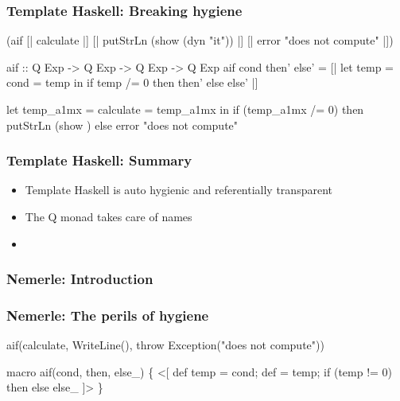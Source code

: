 \documentclass[hyperref={bookmarks=false}]{beamer}
\begin{document}
\begin{frame}[fragile]
\frametitle{Template Haskell: Breaking hygiene}
\begin{semiverbatim}
{\textdollar}(aif [| calculate |]
  [| putStrLn (show \alert{{\textdollar}(dyn "it")}) |]
  [| error "does not compute" |])

aif :: Q Exp -> Q Exp -> Q Exp -> Q Exp
aif cond then' else' =
  [| let temp = {\textdollar}cond
         \text{\color{red}{it}} = temp
     in if temp /= 0 then {\textdollar}then' else {\textdollar}else' |]

let temp_a1mx = calculate
    \text{\color{red}{it_a1my}} = temp_a1mx
in if (temp_a1mx /= 0)
   then putStrLn (show \text{\color{blue}{it_a1my}})
   else error "does not compute"
\end{semiverbatim}
\end{frame}

\begin{frame}[fragile]
\frametitle{Template Haskell: Summary}
\begin{itemize}
\item Template Haskell is auto hygienic and referentially transparent
\item The Q monad takes care of names
\item \text{\color{blue}{Sometimes we need to break hygiene}}
\end{itemize}
\end{frame}

\begin{frame}[fragile]
\frametitle<1>{Nemerle: Introduction}
\frametitle<2>{Nemerle: The perils of hygiene}
\begin{semiverbatim}
aif(calculate,
  WriteLine(),
  throw Exception("does not compute"))

macro aif(cond, then, else_) \{
  <[
    def temp = {\textdollar}cond;
    def  = temp;
    if (temp != 0) {\textdollar}then else {\textdollar}else_
  ]>
\}
\end{semiverbatim}

\end{frame}
\end{document}
